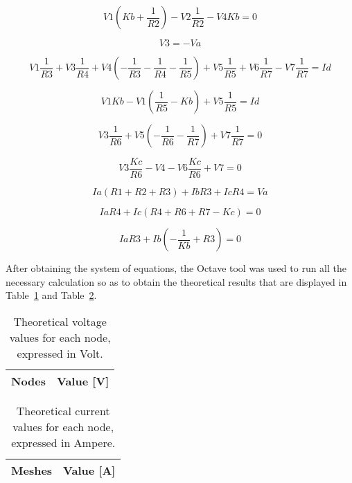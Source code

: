 \begin{equation}
  V1(Kb+\frac{1}{R2}) -V2\frac{1}{R2} - V4Kb = 0
\end{equation}

\begin{equation}
  V3=-Va
\end{equation}

\begin{equation}
  V1\frac{1}{R3} + V3\frac{1}{R4} + V4(-\frac{1}{R3}-\frac{1}{R4}-\frac{1}{R5}) + V5\frac{1}{R5} + V6\frac{1}{R7} - V7\frac{1}{R7} = Id
\end{equation}

\begin{equation}
  V1Kb - V1(\frac{1}{R5}-Kb) + V5\frac{1}{R5}= Id
\end{equation}

\begin{equation}
  V3\frac{1}{R6} + V5(-\frac{1}{R6}-\frac{1}{R7}) + V7\frac{1}{R7}= 0
\end{equation}

\begin{equation}
  V3\frac{Kc}{R6} - V4 - V6\frac{Kc}{R6} + V7 = 0
\end{equation}

\begin{equation}
  Ia(R1+R2+R3) + IbR3 + IcR4 = Va
\end{equation}

\begin{equation}
  IaR4 + Ic(R4+R6+R7-Kc) = 0
\end{equation}

\begin{equation}
  IaR3 + Ib(-\frac{1}{Kb}+R3) = 0
\end{equation}

\vspace{5.0cm}

After obtaining the system of equations, the Octave tool was used to run all the necessary calculation so as to obtain the theoretical results that are displayed in Table~\ref{tab:nos} and Table~\ref{tab:malhas}.

\begin{table}[h]
  \centering
  \begin{tabular}{|l|r|}
    \hline    
    {\bf Nodes} & {\bf Value [V]} \\ \hline
    
  \end{tabular}
  \caption{Theoretical voltage values for each node, expressed in Volt.}
  \label{tab:nos}
\end{table}

\begin{table}[h]
  \centering
  \begin{tabular}{|l|r|}
    \hline    
    {\bf Meshes} & {\bf Value [A]} \\ \hline
    
  \end{tabular}
  \caption{Theoretical current values for each node, expressed in Ampere.}
  \label{tab:malhas}
\end{table}



